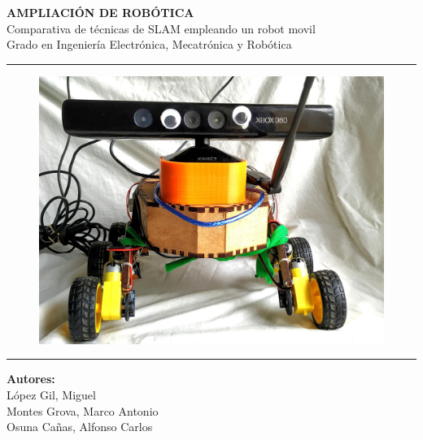 \documentclass[a4paper,twoside]{article}
\begin{document}

\begin{titlepage}
\centering
\Huge{\textbf{AMPLIACIÓN DE ROBÓTICA}} \\
\Huge{Comparativa de técnicas de SLAM empleando un robot movil}\\

\vspace{2cm}
\LARGE{Grado en Ingeniería Electrónica, Mecatrónica y Robótica}\\
\rule{\textwidth}{0.1mm}
\begin{figure}[h!]
	\centering
	\includegraphics[width=.6\textwidth]{images/wheele_real}
\end{figure}
\vspace{2cm}
\rule{\textwidth}{0.1mm}
\Large{\textbf{Autores:} \\
                         López Gil, Miguel \\
                         Montes Grova, Marco Antonio\\
                         Osuna Cañas, Alfonso Carlos}
\end{titlepage}
\newpage
\tableofcontents
\newpage
\end{document}
